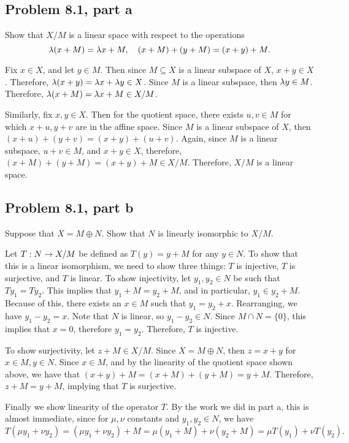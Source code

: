 \subsection{Problem 8.1, part a}
Show that $X/M$ is a linear space with respect to the operations 
\[\mathrm{\lambda}(x + M) = \mathrm{\lambda} x + M, \quad (x + M) + (y + M) = (x + y) + M.\]
\partbreak
\begin{solution}

    Fix $x \in X$, and let $y \in M$. Then since $M \subseteq X$ is a linear subspace of $X$, $x + y \in X$. Therefore, $\mathrm{\lambda}(x + y) = \mathrm{\lambda} x + \mathrm{\lambda} y \in X$. Since $M$ is a linear subspace, then $\mathrm{\lambda} y \in M$. Therefore, $\mathrm{\lambda}(x + M) = \mathrm{\lambda} x + M \in X/M$. \par
    
    \jump
    Similarly, fix $x , y \in X$. Then for the quotient space, there exists $u, v \in M$ for which $x+u, y+v$ are in the affine space. Since $M$ is a linear subspace of $X$, then $(x + u) + (y + v) = (x + y) + (u + v)$. Again, since $M$ is a linear subspace, $u + v \in M$, and $x + y \in X$, therefore, $(x + M) + (y + M) = (x + y) + M \in X/M$. Therefore, $X/M$ is a linear space.   
\end{solution}
\newpage
\subsection{Problem 8.1, part b}
Suppose that $X = M \oplus N$. Show that $N$ is linearly isomorphic to $X/M$. 
\partbreak
\begin{solution}

    Let $T: N \rightarrow X/M$ be defined as $T(y) = y + M$ for any $y \in N$. To show that this is a linear isomorphism, we need to show three things: $T$ is injective, $T$ is surjective, and $T$ is linear. To show injectivity, let $y_1, y_2 \in N$ be such that $Ty_1 = Ty_2$. This implies that $y_1 + M = y_2 + M$, and in particular, $y_1 \in y_2 + M$. Because of this, there exists an $x \in M$ such that $y_1 = y_2 + x$. Rearranging, we have $y_1 - y_2 = x$. Note that $N$ is linear, so $y_1 - y_2 \in N$. Since $M \cap N = \{0\}$, this implies that $x = 0$, therefore $y_1 = y_2$. Therefore, $T$ is injective. \par

    \jump
    To show surjectivity, let $z + M \in X / M$. Since $X = M \oplus N$, then $z = x + y$ for $x \in M, y \in N$. Since $x \in M$, and by the linearity of the quotient space shown above, we have that $(x + y) + M = (x + M) + (y + M) = y + M.$ Therefore, $z + M = y + M$, implying that $T$ is surjective. \par
    
    \jump
    Finally we show linearity of the operator $T$. By the work we did in part a, this is almost immediate, since for $\mu , \nu$ constants and $y_1, y_2 \in N$, we have
    \[T(\mu y_1 + \nu y_2) = (\mu y_1 + \nu y_2) + M = \mu (y_1 + M) + \nu (y_2 + M) = \mu T(y_1) + \nu T(y_2).\]
\end{solution}

